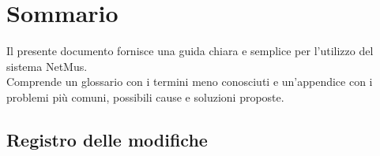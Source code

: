 
\newcommand{\nomedoc}{Manuale Utente}
\newcommand{\versione}{2.0}
\newcommand{\versioneglossario}{4.0}
\newcommand{\versionenormeprogetto}{4.0}
\newcommand{\nomefile}{ManualeUtente-ITA-\versione.pdf}
\newcommand{\datacreazione}{24 Febbraio 2011}
\newcommand{\datamodifica}{19 Marzo 2011}
\newcommand{\stato}{formale}
\newcommand{\uso}{esterno}
\newcommand{\redazione}{Baron Federico}
\newcommand{\verifica}{Cosimo Caputo}
\newcommand{\approvazione}{Mandolo Andrea}
\newcommand{\distribuzione}{
VT.G \\
& Prof. Vardanega Tullio\\
& Prof. Cardin Riccardo }







\chapter*{Sommario}
\thispagestyle{fancy}
Il presente documento fornisce una guida chiara e semplice per l'utilizzo del
sistema NetMus.\\
Comprende un glossario con i termini meno conosciuti e un'appendice con i
problemi pi\`u comuni, possibili cause e soluzioni proposte.

\newpage
\section*{Registro delle modifiche}

